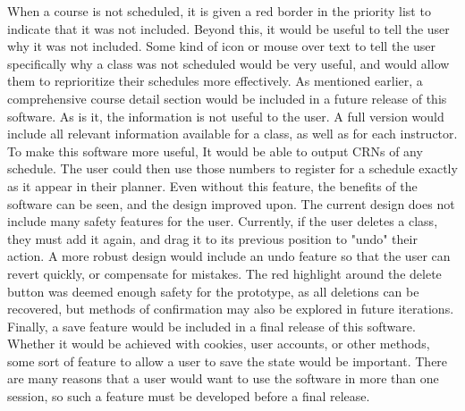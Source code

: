 \documentclass{article}
\begin{document}
\newline
\newline
When a course is not scheduled, it is given a red border in the priority list to indicate that it was not included. Beyond this, it would be useful to tell the user why it was not included. Some kind of icon or mouse over text to tell the user specifically why a class was not scheduled would be very useful, and would allow them to reprioritize their schedules more effectively.
\newline
\newline
As mentioned earlier, a comprehensive course detail section would be included in a future release of this software. As is it, the information is not useful to the user. A full version would include all relevant information available for a class, as well as for each instructor. 
\newline
\newline
To make this software more useful, It would be able to output CRNs of any schedule. The user could then use those numbers to register for a schedule exactly as it appear in their planner. Even without this feature, the benefits of the software can be seen, and the design improved upon.
\newline
\newline
The current design does not include many safety features for the user. Currently, if the user deletes a class, they must add it again, and drag it to its previous position to "undo" their action. A more robust design would include an undo feature so that the user can revert quickly, or compensate for mistakes. The red highlight around the delete button was deemed enough safety for the prototype, as all deletions can be recovered, but methods of confirmation may also be explored in future iterations.
\newline
\newline
Finally, a save feature would be included in a final release of this software. Whether it would be achieved with cookies, user accounts, or other methods, some sort of feature to allow a user to save the state would be important. There are many reasons that a user would want to use the software in more than one session, so such a feature must be developed before a final release.
\end{document}
